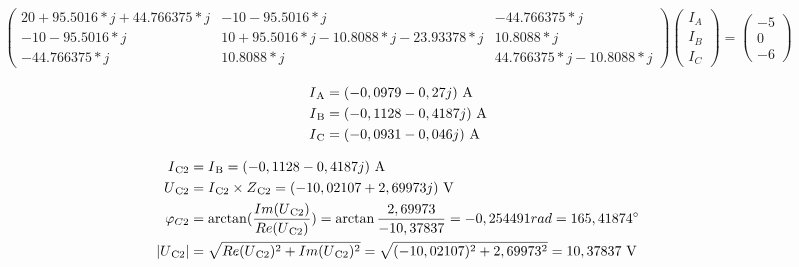 \begin{align*}
\begin{pmatrix}20+95.5016*j+44.766375*j	&-10-95.5016*j&-44.766375*j\\ 
-10-95.5016*j&10+95.5016*j-10.8088*j-23.93378*j&10.8088*j\\ 
-44.766375*j&10.8088*j&44.766375*j-10.8088*j
\end{pmatrix}
\begin{pmatrix}I_A\\ 
I_B\\ 
I_C
\end{pmatrix}
=
\begin{pmatrix}
-5\\ 
0\\ 
-6
\end{pmatrix}
\end{align*}

\begin{align*}
	I\textsubscript{A} &= (-0,0979-0,27j)\ \si{\ampere} \\
	I\textsubscript{B} &= (-0,1128-0,4187j)\ \si{\ampere} \\
	I\textsubscript{C} &= (-0,0931-0,046j)\ \si{\ampere}
\end{align*}

\begin{align*}
	\I{C2} &= \I{B} = (-0,1128-0,4187j)\ \si{\ampere} \\
	\Uu{C2} &= \I{C2} \times \Z{C2} = (-10,02107+2,69973j)\ \si{\volt} \\
	\varphi_{C2}&= \arctan(\frac{Im(\Uu{C2})}{Re(\Uu{C2})}) = \arctan\frac{2,69973}{-10,37837} =-0,254491 rad = 165,41874^\circ \\
	|\Uu{C2}| &= \sqrt{Re(\Uu{C2})^2 + Im(\Uu{C2})^2} = \sqrt{(-10,02107)^2+2,69973^2} = 10,37837\ \si{\volt}
\end{align*}